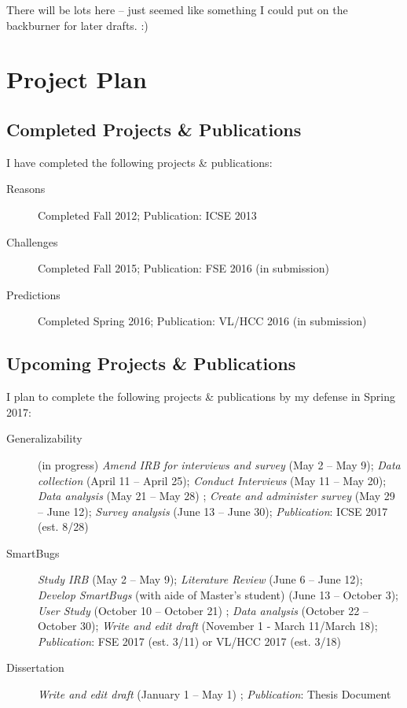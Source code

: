\documentclass{llncs}
\begin{document}
There will be lots here -- just seemed like something I could put on the backburner for later drafts. :)

\section{Project Plan}

\subsection{Completed Projects \& Publications}

I have completed the following projects \& publications:
\begin{description}
	\item[Reasons] Completed Fall 2012; Publication: ICSE 2013
	\item[Challenges] Completed Fall 2015; Publication: FSE 2016 (in submission)
	\item[Predictions] Completed Spring 2016; Publication: VL/HCC 2016 (in submission)
\end{description}

\subsection{Upcoming Projects \& Publications}

I plan to complete the following projects \& publications by my defense in Spring 2017:

\begin{description}
	\item[Generalizability] (in progress) \textit{Amend IRB for interviews and survey} (May 2 -- May 9); \textit{Data collection} (April 11 -- April 25); \textit{Conduct Interviews} (May 11 -- May 20); \textit{Data analysis} (May 21 -- May 28) ; \textit{Create and administer survey} (May 29 -- June 12); \textit{Survey analysis} (June 13 -- June 30); \textit{Publication}: ICSE 2017 (est. 8/28)
	\item[SmartBugs] \textit{Study IRB} (May 2 -- May 9); \textit{Literature Review} (June 6 -- June 12); \textit{Develop SmartBugs} (with aide of Master's student) (June 13 -- October 3); \textit{User Study} (October 10 -- October 21) ; \textit{Data analysis} (October 22 -- October 30); \textit{Write and edit draft} (November 1 - March 11/March 18); \textit{Publication}: FSE 2017 (est. 3/11) or VL/HCC 2017 (est. 3/18)
	\item[Dissertation] \textit{Write and edit draft} (January 1 -- May 1) ; \textit{Publication}: Thesis Document
\end{description}
\end{document}
